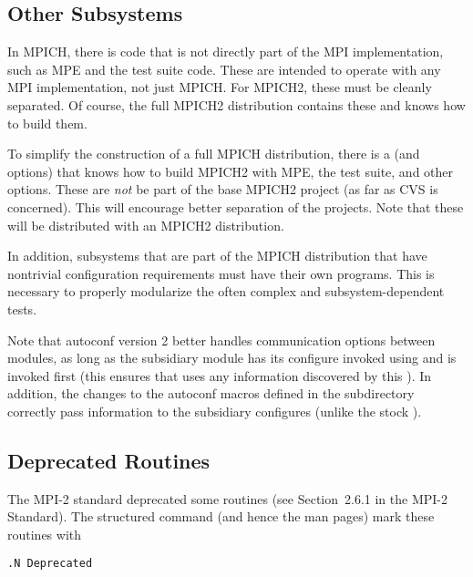 \documentclass{article}
\begin{document}



\subsection{Other Subsystems}
In MPICH, there is code that is not directly part of the MPI
implementation, such as MPE and the test suite code.  These are intended to
operate with any MPI implementation, not just MPICH.
For MPICH2, these must be cleanly separated.  Of course, the full MPICH2
distribution contains these and knows how to build them.

To simplify the construction of a
full MPICH distribution, there is a  (and 
options) that knows how to build MPICH2 with MPE, 
the test 
suite, and other options.  These are \emph{not} be part of the base
MPICH2 project (as far as CVS is concerned).  This will encourage
better separation of the projects.  Note that these will be distributed with
an MPICH2 distribution.  

In addition, subsystems that are part of the MPICH distribution that have
nontrivial configuration requirements must have their own 
programs.  This is necessary to properly modularize the often complex and
subsystem-dependent tests.

Note that autoconf version 2 better handles communication options between
modules, as long as the subsidiary module has its configure invoked using
 and  is invoked first
(this ensures that  uses any information
discovered by this ).  In addition, the changes to the autoconf
macros defined in the  subdirectory correctly pass
information to the subsidiary configures (unlike the stock
).

\subsection{Deprecated Routines}

The MPI-2 standard deprecated some routines (see Section~2.6.1 in the MPI-2
Standard).  The structured command (and hence the man pages) mark
these routines with 
\begin{verbatim}
.N Deprecated
\end{verbatim}
\end{document}
